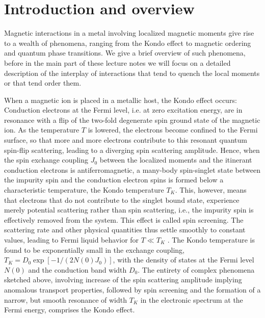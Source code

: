 \documentclass[12pt,twoside]{article}
\begin{document}
\MakeTitle           %


\section{Introduction and overview}
\label{sec:intro}

Magnetic interactions in a metal involving localized magnetic moments 
give rise to a wealth of phenomena, ranging from the Kondo effect to 
magnetic ordering and quantum phase transitions. We give a brief overview 
of such phenomena, before in the main part of these lecture notes 
we will focus on a detailed description of the interplay of interactions 
that tend to quench the local moments or that tend order them.

When a magnetic ion is placed in a metallic host, the Kondo 
effect \cite{Kondo64,Hewson93} occurs: 
Conduction electrons at the Fermi level, i.e. at zero 
excitation energy, are in resonance with a flip of the two-fold 
degenerate spin ground state of the magnetic ion. As the temperature $T$ 
is lowered, the electrons become confined to the Fermi surface, so that
more and more electrons contribute to this resonant quantum spin-flip 
scattering, leading to a diverging spin scattering amplitude.  
Hence, when the spin exchange coupling $J_0$ between the localized moments 
and the itinerant conduction electrons is antiferromagnetic, a 
many-body spin-singlet state between the impurity spin and the 
conduction electron spins is formed below a characteristic temperature,
the Kondo temperature $T_K$. This, however, means that electrons that do 
not contribute to the singlet bound state, experience merely potential 
scattering rather than spin scattering, i.e., the impurity spin is effectively
removed from the system. This effect is called spin screening. 
The scattering rate and other physical quantities thus settle smoothly to 
constant values, leading to Fermi liquid behavior for $T\ll T_K$ 
\cite{Hewson93}. The Kondo temperature is found to be exponentially 
small in the exchange coupling, $T_K=D_0\exp [-1/(2N(0)J_0)]$, with the density 
of states at the Fermi level $N(0)$ and the conduction band width $D_0$.
The entirety of complex phenomena sketched above, involving increase 
of the spin scattering amplitude implying anomalous transport properties, 
followed by spin screening and the formation of a narrow, but smooth 
resonance of width $T_K$ in the electronic spectrum at the Fermi energy, 
comprises the Kondo effect. 
  
\end{document}
